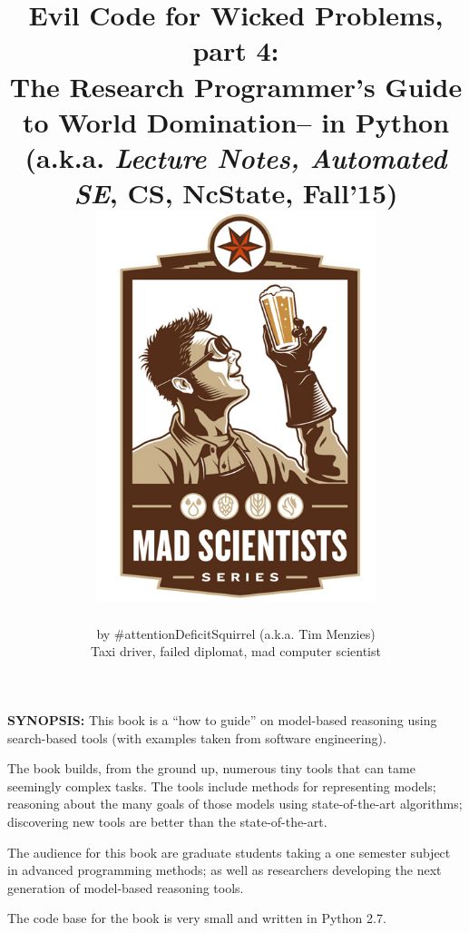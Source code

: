 \documentclass[9pt,twocolumn]{article}
\date{}
\begin{document}
 


\onecolumn
\title{{\bf Evil Code for Wicked Problems, part 4:\\
    The Research Programmer's Guide to World Domination-- in Python\\
  (a.k.a. {\em Lecture Notes, Automated
  SE}, CS, NcState, Fall'15)}\\
 \includegraphics[width=3.2in]{img/six.jpg}}
\author{by \#attentionDeficitSquirrel (a.k.a. Tim Menzies)
  \\Taxi driver, failed diplomat, mad computer scientist }

\maketitle

\begin{center}
 \begin{minipage}{.8\linewidth}
  {\bf SYNOPSIS:} This book is a  ``how to guide'' on model-based reasoning using
  search-based tools (with examples taken from software engineering).\vspace{3mm}
  
  The book builds, from the ground up, numerous
  tiny tools that can tame seemingly complex
  tasks. The tools include methods for
  representing models; reasoning about the
  many goals of those models using state-of-the-art
  algorithms; discovering new tools are better than
  the state-of-the-art. \vspace{3mm}
  
  
  The audience for this book are graduate  students taking
  a one semester subject in advanced programming methods; as
  well as researchers developing the next generation
  of model-based reasoning tools.
   \vspace{3mm}
  
  The code base for the book is very small and written
  in Python 2.7.

  \end{minipage}

  \end{center}
\clearpage
\small
\twocolumn
\end{document}
